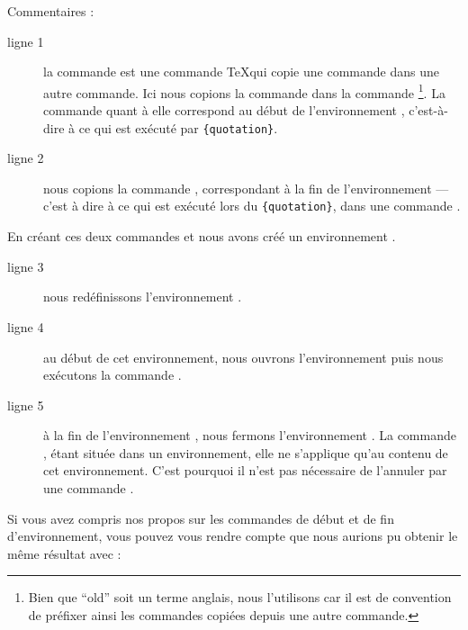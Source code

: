 Commentaires : 

\begin{description}
\item[ligne 1] la commande  est une commande \TeX qui copie une commande dans une autre commande. Ici nous copions la commande  dans la commande \footnote{Bien que \enquote{old} soit un terme anglais, nous l'utilisons car il est de convention de préfixer ainsi les commandes copiées depuis une autre commande.}. La commande  quant à elle correspond au début de l'environnement , c'est-à-dire à ce qui est exécuté par \verb|{quotation}|.
\item[ligne 2] nous copions la commande , correspondant à la fin de l'environnement   --- c'est à dire à ce qui est exécuté lors du \verb|{quotation}|, dans une commande .
\end{description}

En créant ces deux commandes  et  nous avons créé un environnement .

\begin{description}
\item[ligne 3]nous redéfinissons l'environnement .
\item[ligne 4]au début de cet environnement, nous ouvrons l'environnement  puis nous exécutons la commande .
\item[ligne 5]à la fin de l'environnement , nous fermons l'environnement . La commande , étant située dans un environnement, elle ne s'applique qu'au contenu de cet environnement. C'est pourquoi il n'est pas nécessaire de l'annuler par une commande . 
\end{description}

\begin{plusloins}
Si vous avez compris nos propos sur les commandes de début et de fin d'environnement, vous pouvez vous rendre compte que nous aurions pu obtenir le même résultat avec :

\begin{latexcode}
\let\endoldquotation\endquotation
\renewcommand{\quotation}{\oldquotation\singlespace}
\end{latexcode}

\end{plusloins}

